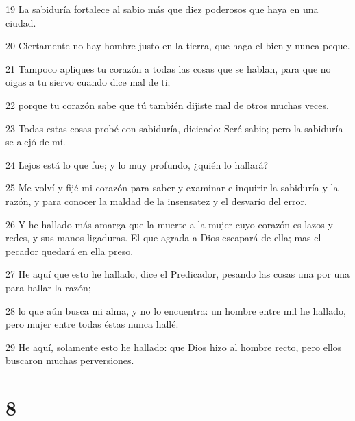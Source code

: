 \par 19 La sabiduría fortalece al sabio más que diez poderosos que haya en una ciudad.
\par 20 Ciertamente no hay hombre justo en la tierra, que haga el bien y nunca peque. 
\par 21 Tampoco apliques tu corazón a todas las cosas que se hablan, para que no oigas a tu siervo cuando dice mal de ti;
\par 22 porque tu corazón sabe que tú también dijiste mal de otros muchas veces.
\par 23 Todas estas cosas probé con sabiduría, diciendo: Seré sabio; pero la sabiduría se alejó de mí.
\par 24 Lejos está lo que fue; y lo muy profundo, ¿quién lo hallará?
\par 25 Me volví y fijé mi corazón para saber y examinar e inquirir la sabiduría y la razón, y para conocer la maldad de la insensatez y el desvarío del error.
\par 26 Y he hallado más amarga que la muerte a la mujer cuyo corazón es lazos y redes, y sus manos ligaduras. El que agrada a Dios escapará de ella; mas el pecador quedará en ella preso.
\par 27 He aquí que esto he hallado, dice el Predicador, pesando las cosas una por una para hallar la razón;
\par 28 lo que aún busca mi alma, y no lo encuentra: un hombre entre mil he hallado, pero mujer entre todas éstas nunca hallé.
\par 29 He aquí, solamente esto he hallado: que Dios hizo al hombre recto, pero ellos buscaron muchas perversiones.

\chapter{8}

